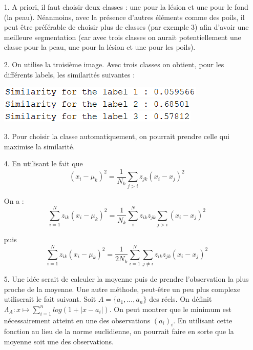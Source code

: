 \documentclass[a4paper, 11pt]{article}
\begin{document}
\begin{itemize}

	\item[1.] A priori, il faut choisir deux classes : une pour la lésion et une pour le fond (la peau). Néanmoins, avec la présence d'autres éléments comme des poils, il peut être préférable de choisir plus de classes (par exemple 3) afin d'avoir une meilleure segmentation (car avec trois classes on aurait potentiellement une classe pour la peau, une pour la lésion et une pour les poils).
	
	\item[2.] On utilise la troisième image. Avec trois classes on obtient, pour les différents labels, les similarités suivantes :
	
\begin{center}
	\includegraphics[scale=1]{sim_lab1.PNG} \\
	\includegraphics[scale=1]{sim_lab2.PNG} \\
	\includegraphics[scale=1]{sim_lab3.PNG}
\end{center}
	
	\item[3.] Pour choisir la classe automatiquement, on pourrait prendre celle qui maximise la similarité.

	\item[4.] En utilisant le fait que \[ (x_i  - \mu_k)^2 = \frac{1}{N_k} \sum_{j>i} z_{jk}(x_i - x_j)^2 \]
	
On a : \[ \sum_{i = 1}^N z_{ik} (x_i - \mu_k)^2 = \frac{1}{N_k} \sum_i^N z_{ik} z_{jk} \sum_{j>i} (x_i - x_j)^2 \]

puis \[ \boxed{\sum_{i = 1}^N z_{ik} (x_i - \mu_k)^2 = \frac{1}{2N_k} \sum_{i = 1}^N  \sum_{j\neq i} z_{ik} z_{jk}(x_i - x_j)^2} \]
	
	\item[5.] Une idée serait de calculer la moyenne puis de prendre l'observation la plus proche de la moyenne. Une autre méthode, peut-être un peu plus complexe utiliserait le fait suivant. Soit $ A = \lbrace a_{1}, ..., a_{n} \rbrace$ des réels. On définit $\Lambda_{A} : x \mapsto \sum_{i = 1}^{n} log(1 + |x - a_{i}|)$. On peut montrer que le minimum est nécessairement atteint en une des observations $(a_{i})_{i}$. En utilisant cette fonction au lieu de la norme euclidienne, on pourrait faire en sorte que la moyenne soit une des observations. 

\end{itemize}
\end{document}
